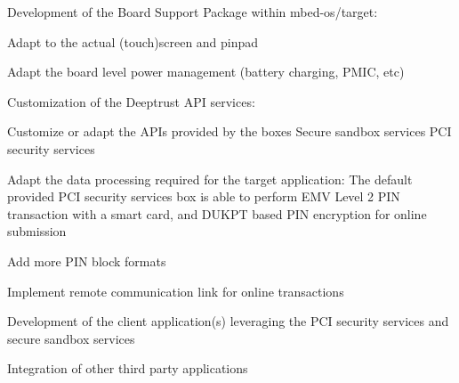 \begin{DoxyItemize}
\item Development of the Board Support Package within mbed-\/os/target\+:
\begin{DoxyItemize}
\item Adapt to the actual (touch)screen and pinpad
\item Adapt the board level power management (battery charging, P\+M\+IC, etc)
\end{DoxyItemize}
\item Customization of the Deeptrust A\+PI services\+:
\begin{DoxyItemize}
\item Customize or adapt the A\+P\+Is provided by the boxes Secure sandbox services P\+CI security services
\end{DoxyItemize}
\item Adapt the data processing required for the target application\+: The default provided P\+CI security services box is able to perform E\+MV Level 2 P\+IN transaction with a smart card, and D\+U\+K\+PT based P\+IN encryption for online submission
\begin{DoxyItemize}
\item Add more P\+IN block formats
\item Implement remote communication link for online transactions
\end{DoxyItemize}
\item Development of the client application(s) leveraging the P\+CI security services and secure sandbox services
\item Integration of other third party applications 
\end{DoxyItemize}